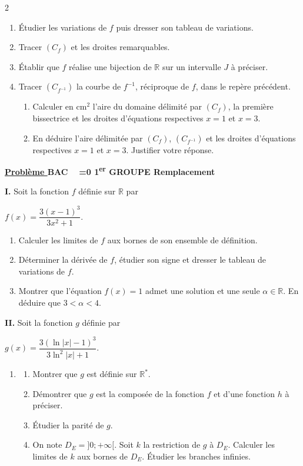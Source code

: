 \documentclass[12pt,a4paper]{article}
\newcounter{probleme}
\newcounter{annee}
\newcounter{session}
\newcommand{\exo}{%
    \refstepcounter{probleme}%
    \par\medskip
    \noindent\textbf{\underline{Problème \theprobleme}\quad
    BAC \theannee\ %
    \ifnum\value{session}=0
        1\textsuperscript{er} GROUPE%
        \setcounter{session}{1}%
    \else
        Remplacement%
        \setcounter{session}{0}%
        \stepcounter{annee}%
    \fi
    }
    \par\medskip
}
\begin{document}
\begin{multicols}{2}
\begin{enumerate}
\item Étudier les variations de $f$ puis dresser son tableau de variations.

\item Tracer $(C_f)$ et les droites remarquables.

\item Établir que $f$ réalise une bijection de $\mathbb{R}$ sur un intervalle $J$ à préciser.
\item Tracer $(C_{f^{-1}})$ la courbe de $f^{-1}$, réciproque de $f$, dans le repère précédent.
\begin{enumerate}
\item Calculer en cm$^2$ l’aire du domaine délimité par $(C_f)$, la première bissectrice et les droites d’équations respectives \( x=1 \) et \( x=3 \).
\item En déduire l’aire délimitée par $(C_f)$, $(C_{f^{-1}})$ et les droites d’équations respectives \( x=1 \) et \( x=3 \).  
Justifier votre réponse.
\end{enumerate}
\end{enumerate}
\exo

\textbf{I.} Soit la fonction $f$ définie sur $\mathbb{R}$ par

\( f(x)=\dfrac{3(x-1)^3}{3x^2+1}. \)

\begin{enumerate}
\item Calculer les limites de $f$ aux bornes de son ensemble de définition.

\item Déterminer la dérivée de $f$, étudier son signe et dresser le tableau de variations de $f$.

\item Montrer que l’équation \( f(x)=1 \) admet une solution et une seule $\alpha \in \mathbb{R}$.  
En déduire que \( 3<\alpha<4 \).
\end{enumerate}

\textbf{II.} Soit la fonction $g$ définie par

\( g(x)=\dfrac{3(\ln|x|-1)^3}{3\ln^2|x|+1}. \)
\begin{enumerate}
\item 
\begin{enumerate}
\item Montrer que $g$ est définie sur $\mathbb{R}^*$.
\item Démontrer que $g$ est la composée de la fonction $f$ et d’une fonction $h$ à préciser.
\item Étudier la parité de $g$.
\item On note $D_E=]0;+\infty[$.  
Soit $k$ la restriction de $g$ à $D_E$.  
Calculer les limites de $k$ aux bornes de $D_E$.  
Étudier les branches infinies.
\end{enumerate}


\end{enumerate}
\end{multicols}
\end{document}
